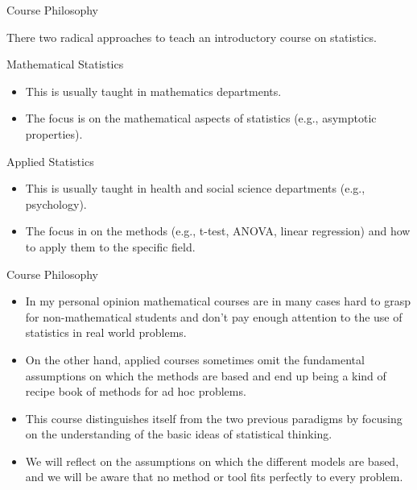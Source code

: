 \documentclass[handout]{beamer}
\begin{document}
\begin{frame}{Course Philosophy}

\scriptsize{
There two radical approaches to teach an introductory course on statistics.
\begin{block}{Mathematical Statistics}
 \begin{itemize}
\item This is usually taught in mathematics departments.
\item The focus is on the mathematical aspects of statistics (e.g., asymptotic properties).
\end{itemize}
\end{block}


\begin{block}{Applied Statistics}
 \begin{itemize}
\item This is usually taught in health and social science departments (e.g., psychology).
\item The focus in on the methods (e.g., t-test, ANOVA, linear regression) and how to apply them to the specific field.
\end{itemize}
\end{block}




}
 
\end{frame}

\begin{frame}{Course Philosophy}

\scriptsize{
 \begin{itemize}
\item In my personal opinion mathematical courses are in many cases hard to grasp for non-mathematical students and don't pay enough attention to the use of statistics in real world problems.
\item On the other hand, applied courses sometimes omit the fundamental assumptions on which the methods are based and end up being a kind of recipe book of methods for ad hoc problems. 

\item This course distinguishes itself from the two previous paradigms by focusing on the understanding of the basic ideas of statistical thinking.

\item We will reflect on the assumptions on which the different models are based, and we will be aware that no method or tool fits perfectly to every problem.

\end{itemize}



}
 
\end{frame}
\end{document}
